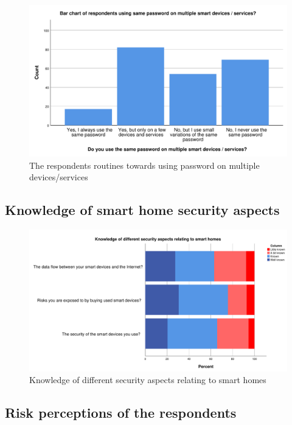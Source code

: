 \begin{figure}[H]
    \centering
    \includegraphics[scale=0.55]{figures/diagrams/password_reuse.pdf}
    \caption{The respondents routines towards using password on multiple devices/services}
    \label{fig:password_reuse}
\end{figure}

\subsection{Knowledge of smart home security aspects}

\begin{figure}[H]
    \centering
    \includegraphics[scale=0.45]{figures/diagrams/knowledge_security.pdf}
    \caption{Knowledge of different security aspects relating to smart homes}
    \label{fig:knowledge_security}
\end{figure}

\subsection{Risk perceptions of the respondents}

